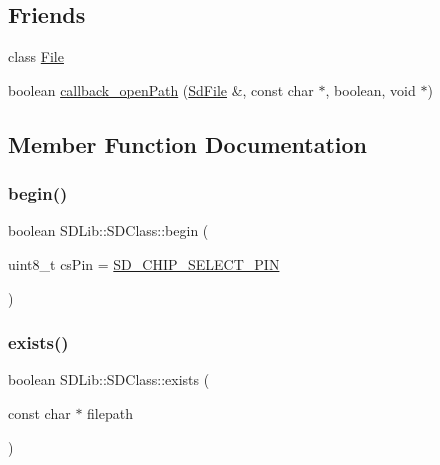 \subsection*{Friends}
\begin{DoxyCompactItemize}
\item 
class \hyperlink{class_s_d_lib_1_1_s_d_class_a68d15876ad188b7628261b12d0eac8aa}{File}
\item 
boolean \hyperlink{class_s_d_lib_1_1_s_d_class_a18f78f3da41fcdd7b15eac188c1c1939}{callback\+\_\+open\+Path} (\hyperlink{class_sd_file}{Sd\+File} \&, const char $\ast$, boolean, void $\ast$)
\end{DoxyCompactItemize}


\subsection{Member Function Documentation}
\mbox{\label{class_s_d_lib_1_1_s_d_class_a72fc9def5c1850b4b4bee984c6781c55}} 
\subsubsection{\texorpdfstring{begin()}{begin()}}
{\footnotesize\ttfamily boolean S\+D\+Lib\+::\+S\+D\+Class\+::begin (\begin{DoxyParamCaption}\item[{uint8\+\_\+t}]{cs\+Pin = {\ttfamily \hyperlink{_sd2_card_8h_ae6b17538c14ba6c91ccb513db2c4c29c}{S\+D\+\_\+\+C\+H\+I\+P\+\_\+\+S\+E\+L\+E\+C\+T\+\_\+\+P\+IN}} }\end{DoxyParamCaption})}

\mbox{\label{class_s_d_lib_1_1_s_d_class_a0b362aab87a4f3c4cebe3b804c084311}} 
\subsubsection{\texorpdfstring{exists()}{exists()}\hspace{0.1cm}{\footnotesize\ttfamily [1/2]}}
{\footnotesize\ttfamily boolean S\+D\+Lib\+::\+S\+D\+Class\+::exists (\begin{DoxyParamCaption}\item[{const char $\ast$}]{filepath }\end{DoxyParamCaption})}

